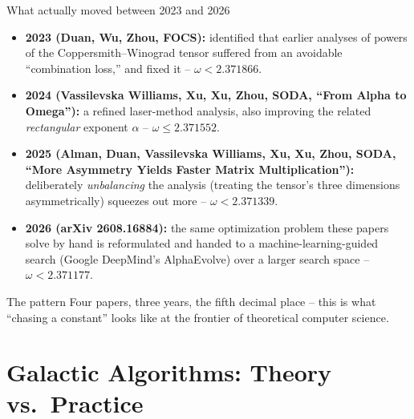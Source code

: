 \documentclass[11pt,aspectratio=169]{beamer}
\begin{document}
\begin{frame}{What actually moved between 2023 and 2026}
  \small
  \begin{itemize}
    \item \textbf{2023 (Duan, Wu, Zhou, FOCS):} identified that earlier analyses of powers
    of the Coppersmith--Winograd tensor suffered from an avoidable ``combination loss,'' and
    fixed it -- $\omega < 2.371866$.
    \item \textbf{2024 (Vassilevska Williams, Xu, Xu, Zhou, SODA, ``From Alpha to Omega''):}
    a refined laser-method analysis, also improving the related \emph{rectangular} exponent
    $\alpha$ -- $\omega \le 2.371552$.
    \item \textbf{2025 (Alman, Duan, Vassilevska Williams, Xu, Xu, Zhou, SODA, ``More
    Asymmetry Yields Faster Matrix Multiplication''):} deliberately \emph{unbalancing} the
    analysis (treating the tensor's three dimensions asymmetrically) squeezes out more --
    $\omega < 2.371339$.
    \item \textbf{2026 (arXiv 2608.16884):} the same optimization problem these papers solve
    by hand is reformulated and handed to a machine-learning-guided search
    (Google DeepMind's AlphaEvolve) over a larger search space -- $\omega < 2.371177$.
  \end{itemize}
  \begin{exampleblock}{The pattern}
    Four papers, three years, the fifth decimal place -- this is what ``chasing a constant''
    looks like at the frontier of theoretical computer science.
  \end{exampleblock}
\end{frame}

\section{Galactic Algorithms: Theory vs.\ Practice}
\end{document}
